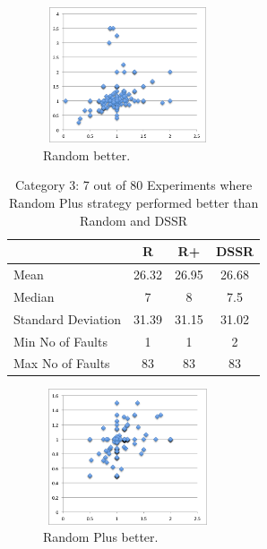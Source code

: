 \documentclass[conference]{IEEEtran}
\begin{document}
\begin{figure}[ht]
\centering
\includegraphics[width=5cm,height=4cm]{Randombetter5.png}
\caption{Random better.}
\label{fig:Randombetter}
\end{figure}




\begin{table}[H]
\caption{Category 3: 7 out of 80 Experiments where Random Plus strategy performed better than Random and DSSR}
\centering
\begin{tabular}{|l|c|c|c|}
\hline\hline
 				& R			& R+				&  DSSR 	\\
\hline
Mean  			&    26.32		&  26.95			&  26.68\\
Median 			&    7 		&  8	 			&  7.5 \\
Standard Deviation 	&    31.39		&  31.15			&  31.02\\
Min No of Faults	&    1			&  1				&  2\\
Max No of Faults 	&    83		&  83				&  83\\
\hline
\end{tabular}
\label{table:RandomPlusbetter}
\end{table}


\begin{figure}[H]
\centering
\includegraphics[width=5cm,height=4cm]{RandomPlusbetter5.png}
\caption{Random Plus better.}
\label{fig:RandomPlusbetter}
\end{figure}



\end{document}
